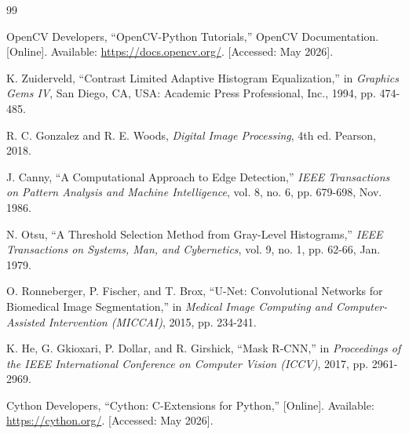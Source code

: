 \documentclass[12pt, a4paper]{report}
\begin{document}
\clearpage %
\begin{thebibliography}{99}

OpenCV Developers, ``OpenCV-Python Tutorials,'' OpenCV Documentation. [Online]. Available: \url{https://docs.opencv.org/}. [Accessed: May 2026].

K. Zuiderveld, ``Contrast Limited Adaptive Histogram Equalization,'' in \textit{Graphics Gems IV}, San Diego, CA, USA: Academic Press Professional, Inc., 1994, pp. 474-485.

R. C. Gonzalez and R. E. Woods, \textit{Digital Image Processing}, 4th ed. Pearson, 2018.

J. Canny, ``A Computational Approach to Edge Detection,'' \textit{IEEE Transactions on Pattern Analysis and Machine Intelligence}, vol. 8, no. 6, pp. 679-698, Nov. 1986.

N. Otsu, ``A Threshold Selection Method from Gray-Level Histograms,'' \textit{IEEE Transactions on Systems, Man, and Cybernetics}, vol. 9, no. 1, pp. 62-66, Jan. 1979.



O. Ronneberger, P. Fischer, and T. Brox, ``U-Net: Convolutional Networks for Biomedical Image Segmentation,'' in \textit{Medical Image Computing and Computer-Assisted Intervention (MICCAI)}, 2015, pp. 234-241.

K. He, G. Gkioxari, P. Dollar, and R. Girshick, ``Mask R-CNN,'' in \textit{Proceedings of the IEEE International Conference on Computer Vision (ICCV)}, 2017, pp. 2961-2969.

Cython Developers, ``Cython: C-Extensions for Python,'' [Online]. Available: \url{https://cython.org/}. [Accessed: May 2026].


\end{thebibliography}
\end{document}
